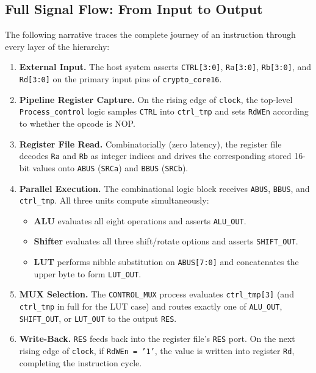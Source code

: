 \documentclass[12pt, a4paper]{report}
\begin{document}
\subsection{Full Signal Flow: From Input to Output}

The following narrative traces the complete journey of an instruction through
every layer of the hierarchy:

\begin{enumerate}[leftmargin=*, label=\textbf{Step \arabic*:}]

  \item \textbf{External Input.}
        The host system asserts \texttt{CTRL[3:0]}, \texttt{Ra[3:0]}, \texttt{Rb[3:0]},
        and \texttt{Rd[3:0]} on the primary input pins of \texttt{crypto\_core16}.

  \item \textbf{Pipeline Register Capture.}
        On the rising edge of \texttt{clock}, the top-level
        \texttt{Process\_control} logic samples \texttt{CTRL} into
        \texttt{ctrl\_tmp} and sets \texttt{RdWEn} according to whether the opcode is NOP.

  \item \textbf{Register File Read.}
        Combinatorially (zero latency), the register file decodes \texttt{Ra} and
        \texttt{Rb} as integer indices and drives the corresponding stored 16-bit
        values onto \texttt{ABUS} (\texttt{SRCa}) and \texttt{BBUS} (\texttt{SRCb}).

  \item \textbf{Parallel Execution.}
        The combinational logic block receives \texttt{ABUS}, \texttt{BBUS}, and
        \texttt{ctrl\_tmp}. All three units compute simultaneously:
        \begin{itemize}
          \item \textbf{ALU} evaluates all eight operations and asserts \texttt{ALU\_OUT}.
          \item \textbf{Shifter} evaluates all three shift/rotate options and asserts
                \texttt{SHIFT\_OUT}.
          \item \textbf{LUT} performs nibble substitution on \texttt{ABUS[7:0]} and
                concatenates the upper byte to form \texttt{LUT\_OUT}.
        \end{itemize}

  \item \textbf{MUX Selection.}
        The \texttt{CONTROL\_MUX} process evaluates \texttt{ctrl\_tmp[3]} (and
        \texttt{ctrl\_tmp} in full for the LUT case) and routes exactly one of
        \texttt{ALU\_OUT}, \texttt{SHIFT\_OUT}, or \texttt{LUT\_OUT} to
        the output \texttt{RES}.

  \item \textbf{Write-Back.}
        \texttt{RES} feeds back into the register file's \texttt{RES} port.
        On the next rising edge of \texttt{clock}, if \texttt{RdWEn = '1'},
        the value is written into register \texttt{Rd}, completing the instruction cycle.

\end{enumerate}
\end{document}
